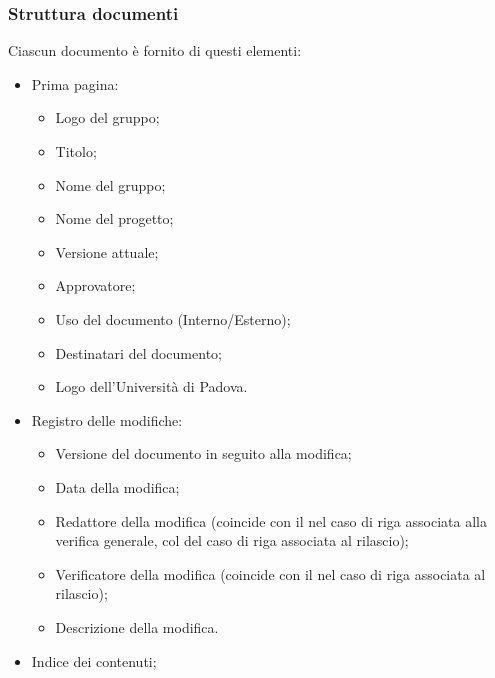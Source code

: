 \subsubsection{Struttura documenti}
\par Ciascun documento è fornito di questi elementi:
\begin{itemize}
  \item Prima pagina:
  \begin{itemize}
    \item Logo del gruppo;
    \item Titolo;
    \item Nome del gruppo;
    \item Nome del progetto;
    \item Versione attuale;
    \item Approvatore;
    \item Uso del documento (Interno/Esterno);
    \item Destinatari del documento;
    \item Logo dell'Università di Padova.
  \end{itemize}
  \item Registro delle modifiche:
  \begin{itemize}
    \item Versione del documento in seguito alla modifica;
    \item Data della modifica;
    \item Redattore della modifica (coincide con il \Verificatore{} nel caso di riga associata alla verifica generale, col \Responsabile{} del caso di riga associata al rilascio);
    \item Verificatore della modifica (coincide con il \Responsabile{} nel caso di riga associata al rilascio);
    \item Descrizione della modifica.
  \end{itemize}
  \item Indice dei contenuti;
\end{itemize}


